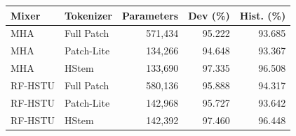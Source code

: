 \begin{tabular}{llrrr}
\toprule Mixer & Tokenizer & Parameters & Dev (\%) & Hist. (\%)\\\midrule
MHA & Full Patch & 571,434 & 95.222 & 93.685\\
MHA & Patch-Lite & 134,266 & 94.648 & 93.367\\
MHA & HStem & 133,690 & 97.335 & 96.508\\
RF-HSTU & Full Patch & 580,136 & 95.888 & 94.317\\
RF-HSTU & Patch-Lite & 142,968 & 95.727 & 93.642\\
RF-HSTU & HStem & 142,392 & 97.460 & 96.448\\
\bottomrule\end{tabular}

